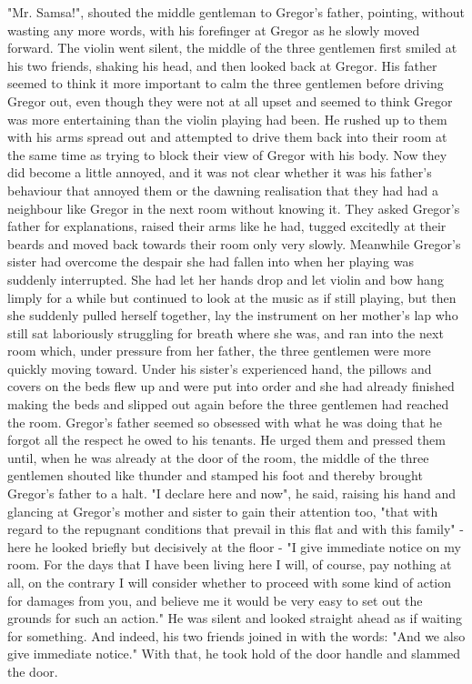 \documentclass[12pt]{book}
\begin{document}
    "Mr. Samsa!", shouted the middle gentleman to Gregor's father, pointing, without wasting any more words, with his forefinger at Gregor as he slowly moved forward. The violin went silent, the middle of the three gentlemen first smiled at his two friends, shaking his head, and then looked back at Gregor. His father seemed to think it more important to calm the three gentlemen before driving Gregor out, even though they were not at all upset and seemed to think Gregor was more entertaining than the violin playing had been. He rushed up to them with his arms spread out and attempted to drive them back into their room at the same time as trying to block their view of Gregor with his body. Now they did become a little annoyed, and it was not clear whether it was his father's behaviour that annoyed them or the dawning realisation that they had had a neighbour like Gregor in the next room without knowing it. They asked Gregor's father for explanations, raised their arms like he had, tugged excitedly at their beards and moved back towards their room only very slowly. Meanwhile Gregor's sister had overcome the despair she had fallen into when her playing was suddenly interrupted. She had let her hands drop and let violin and bow hang limply for a while but continued to look at the music as if still playing, but then she suddenly pulled herself together, lay the instrument on her mother's lap who still sat laboriously struggling for breath where she was, and ran into the next room which, under pressure from her father, the three gentlemen were more quickly moving toward. Under his sister's experienced hand, the pillows and covers on the beds flew up and were put into order and she had already finished making the beds and slipped out again before the three gentlemen had reached the room. Gregor's father seemed so obsessed with what he was doing that he forgot all the respect he owed to his tenants. He urged them and pressed them until, when he was already at the door of the room, the middle of the three gentlemen shouted like thunder and stamped his foot and thereby brought Gregor's father to a halt. "I declare here and now", he said, raising his hand and glancing at Gregor's mother and sister to gain their attention too, "that with regard to the repugnant conditions that prevail in this flat and with this family" - here he looked briefly but decisively at the floor - "I give immediate notice on my room. For the days that I have been living here I will, of course, pay nothing at all, on the contrary I will consider whether to proceed with some kind of action for damages from you, and believe me it would be very easy to set out the grounds for such an action." He was silent and looked straight ahead as if waiting for something. And indeed, his two friends joined in with the words: "And we also give immediate notice." With that, he took hold of the door handle and slammed the door.
\end{document}
